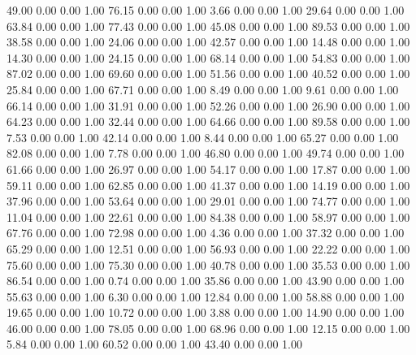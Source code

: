    49.00   0.00   0.00   1.00
   76.15   0.00   0.00   1.00
    3.66   0.00   0.00   1.00
   29.64   0.00   0.00   1.00
   63.84   0.00   0.00   1.00
   77.43   0.00   0.00   1.00
   45.08   0.00   0.00   1.00
   89.53   0.00   0.00   1.00
   38.58   0.00   0.00   1.00
   24.06   0.00   0.00   1.00
   42.57   0.00   0.00   1.00
   14.48   0.00   0.00   1.00
   14.30   0.00   0.00   1.00
   24.15   0.00   0.00   1.00
   68.14   0.00   0.00   1.00
   54.83   0.00   0.00   1.00
   87.02   0.00   0.00   1.00
   69.60   0.00   0.00   1.00
   51.56   0.00   0.00   1.00
   40.52   0.00   0.00   1.00
   25.84   0.00   0.00   1.00
   67.71   0.00   0.00   1.00
    8.49   0.00   0.00   1.00
    9.61   0.00   0.00   1.00
   66.14   0.00   0.00   1.00
   31.91   0.00   0.00   1.00
   52.26   0.00   0.00   1.00
   26.90   0.00   0.00   1.00
   64.23   0.00   0.00   1.00
   32.44   0.00   0.00   1.00
   64.66   0.00   0.00   1.00
   89.58   0.00   0.00   1.00
    7.53   0.00   0.00   1.00
   42.14   0.00   0.00   1.00
    8.44   0.00   0.00   1.00
   65.27   0.00   0.00   1.00
   82.08   0.00   0.00   1.00
    7.78   0.00   0.00   1.00
   46.80   0.00   0.00   1.00
   49.74   0.00   0.00   1.00
   61.66   0.00   0.00   1.00
   26.97   0.00   0.00   1.00
   54.17   0.00   0.00   1.00
   17.87   0.00   0.00   1.00
   59.11   0.00   0.00   1.00
   62.85   0.00   0.00   1.00
   41.37   0.00   0.00   1.00
   14.19   0.00   0.00   1.00
   37.96   0.00   0.00   1.00
   53.64   0.00   0.00   1.00
   29.01   0.00   0.00   1.00
   74.77   0.00   0.00   1.00
   11.04   0.00   0.00   1.00
   22.61   0.00   0.00   1.00
   84.38   0.00   0.00   1.00
   58.97   0.00   0.00   1.00
   67.76   0.00   0.00   1.00
   72.98   0.00   0.00   1.00
    4.36   0.00   0.00   1.00
   37.32   0.00   0.00   1.00
   65.29   0.00   0.00   1.00
   12.51   0.00   0.00   1.00
   56.93   0.00   0.00   1.00
   22.22   0.00   0.00   1.00
   75.60   0.00   0.00   1.00
   75.30   0.00   0.00   1.00
   40.78   0.00   0.00   1.00
   35.53   0.00   0.00   1.00
   86.54   0.00   0.00   1.00
    0.74   0.00   0.00   1.00
   35.86   0.00   0.00   1.00
   43.90   0.00   0.00   1.00
   55.63   0.00   0.00   1.00
    6.30   0.00   0.00   1.00
   12.84   0.00   0.00   1.00
   58.88   0.00   0.00   1.00
   19.65   0.00   0.00   1.00
   10.72   0.00   0.00   1.00
    3.88   0.00   0.00   1.00
   14.90   0.00   0.00   1.00
   46.00   0.00   0.00   1.00
   78.05   0.00   0.00   1.00
   68.96   0.00   0.00   1.00
   12.15   0.00   0.00   1.00
    5.84   0.00   0.00   1.00
   60.52   0.00   0.00   1.00
   43.40   0.00   0.00   1.00

